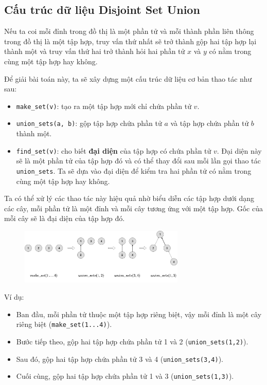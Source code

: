 \subsection{Cấu trúc dữ liệu Disjoint Set Union}

Nếu ta coi mỗi đỉnh trong đồ thị là một phần tử và mỗi thành phần liên thông trong đồ thị là một tập hợp, truy vấn thứ nhất sẽ trở thành gộp hai tập hợp lại thành một và truy vấn thứ hai trở thành hỏi hai phần tử $x$ và $y$ có nằm trong cùng một tập hợp hay không.

Để giải bài toán này, ta sẽ xây dựng một cấu trúc dữ liệu cơ bản thao tác như sau:
\begin{itemize}
    \item \texttt{make\_set(v)}: tạo ra một tập hợp mới chỉ chứa phần tử $v$.
    \item \texttt{union\_sets(a, b)}: gộp tập hợp chứa phần tử $a$ và tập hợp chứa phần tử $b$ thành một.
    \item \texttt{find\_set(v)}: cho biết \textbf{đại diện} của tập hợp có chứa phần tử $v$. Đại diện này sẽ là một phần tử của tập hợp đó và có thể thay đổi sau mỗi lần gọi thao tác \texttt{union\_sets}. Ta sẽ dựa vào đại diện để kiểm tra hai phần tử có nằm trong cùng một tập hợp hay không.
\end{itemize}

Ta có thể xử lý các thao tác này hiệu quả nhờ biểu diễn các tập hợp dưới dạng các cây, mỗi phần tử là một đỉnh và mỗi cây tương ứng với một tập hợp. Gốc của mỗi cây sẽ là đại diện của tập hợp đó.

\begin{figure}[h]
    \centering
    \includegraphics[width=0.7\textwidth]{resource/img/b8/disjoint-set-union_img1.png}
\end{figure}

Ví dụ:
\begin{itemize}
    \item Ban đầu, mỗi phần tử thuộc một tập hợp riêng biệt, vậy mỗi đỉnh là một cây riêng biệt (\texttt{make\_set(1...4)}).
    \item Bước tiếp theo, gộp hai tập hợp chứa phần tử 1 và 2 (\texttt{union\_sets(1,2)}).
    \item Sau đó, gộp hai tập hợp chứa phần tử 3 và 4 (\texttt{union\_sets(3,4)}).
    \item Cuối cùng, gộp hai tập hợp chứa phần tử 1 và 3 (\texttt{union\_sets(1,3)}).
\end{itemize}

